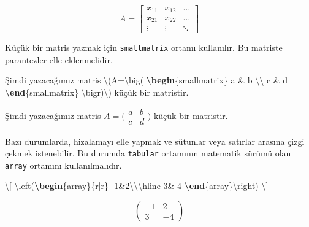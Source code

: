 \documentclass[
  10pt,
]{scrbook}
\newenvironment{Shaded}{}{}
\newcommand{\ExtensionTok}[1]{#1}
\newcommand{\KeywordTok}[1]{\textcolor[rgb]{0.00,0.44,0.13}{\textbf{#1}}}
\newcommand{\NormalTok}[1]{#1}
\newcommand{\SpecialCharTok}[1]{\textcolor[rgb]{0.25,0.44,0.63}{#1}}
\newcommand{\SpecialStringTok}[1]{\textcolor[rgb]{0.73,0.40,0.53}{#1}}
\theoremstyle{definition}
\theoremstyle{definition}
\theoremstyle{definition}
\theoremstyle{definition}
\theoremstyle{remark}
\begin{document}
\[
A=
\begin{bmatrix}
x_{11} & x_{12} & \dots \\
x_{21} & x_{22} & \dots \\
\vdots & \vdots & \ddots
\end{bmatrix}
\]

Küçük bir matris yazmak için \texttt{smallmatrix} ortamı kullanılır. Bu matriste parantezler elle eklenmelidir.

\begin{Shaded}
\begin{Highlighting}[]
\NormalTok{Şimdi yazacağımız matris}
\SpecialStringTok{\textbackslash{}(A=}\SpecialCharTok{\textbackslash{}big}\SpecialStringTok{(}
\KeywordTok{\textbackslash{}begin}\NormalTok{\{}\ExtensionTok{smallmatrix}\NormalTok{\}}
\SpecialStringTok{a \& b }\SpecialCharTok{\textbackslash{}\textbackslash{}}
\SpecialStringTok{c \& d}
\KeywordTok{\textbackslash{}end}\NormalTok{\{}\ExtensionTok{smallmatrix}\NormalTok{\}}
\SpecialCharTok{\textbackslash{}bigr}\SpecialStringTok{)\textbackslash{})}
\NormalTok{küçük bir matristir.}
\end{Highlighting}
\end{Shaded}

Şimdi yazacağımız matris \(A=\bigl( \begin{smallmatrix} a & b \\ c & d \end{smallmatrix} \bigr)\) küçük bir matristir.

Bazı durumlarda, hizalamayı elle yapmak ve sütunlar veya satırlar arasına çizgi çekmek istenebilir. Bu durumda \texttt{tabular} ortamının matematik sürümü olan \texttt{array} ortamını kullanılmalıdır.

\begin{Shaded}
\begin{Highlighting}[]
\SpecialStringTok{\textbackslash{}[}
\SpecialCharTok{\textbackslash{}left}\SpecialStringTok{(}\KeywordTok{\textbackslash{}begin}\NormalTok{\{}\ExtensionTok{array}\NormalTok{\}}\SpecialStringTok{\{r|r\}}
\SpecialStringTok{{-}1\&2}\SpecialCharTok{\textbackslash{}\textbackslash{}\textbackslash{}hline}
\SpecialStringTok{3\&{-}4}
\KeywordTok{\textbackslash{}end}\NormalTok{\{}\ExtensionTok{array}\NormalTok{\}}\SpecialCharTok{\textbackslash{}right}\SpecialStringTok{)}
\SpecialStringTok{\textbackslash{}]}
\end{Highlighting}
\end{Shaded}

\[
\left(\begin{array}{r|r}
-1&2\\\hline
3&-4
\end{array}\right)
\]
\end{document}
